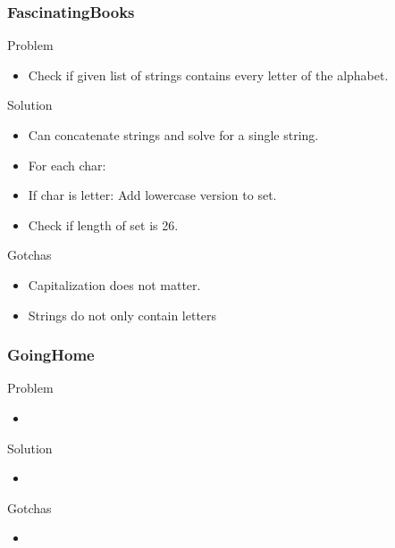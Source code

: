 \documentclass{beamer}
\begin{document}
\begin{frame}
    \frametitle{FascinatingBooks}
    \begin{block}{Problem}
        \begin{itemize}
            \item Check if given list of strings contains every letter of the alphabet.
        \end{itemize}
    \end{block}
    \begin{block}{Solution}
        \begin{itemize}
            \item Can concatenate strings and solve for a single string.
            \item For each char:
            \item If char is letter: Add lowercase version to set.
            \item Check if length of set is 26.
        \end{itemize}
    \end{block}
    \begin{block}{Gotchas}
        \begin{itemize}
            \item Capitalization does not matter.
            \item Strings do not only contain letters
        \end{itemize}
    \end{block}
\end{frame}

\begin{frame}
    \frametitle{GoingHome}
    \begin{block}{Problem}
        \begin{itemize}
            \item 
        \end{itemize}
    \end{block}
    \begin{block}{Solution}
        \begin{itemize}
            \item 
        \end{itemize}
    \end{block}
    \begin{block}{Gotchas}
        \begin{itemize}
            \item 
        \end{itemize}
    \end{block}
\end{frame}
\end{document}
